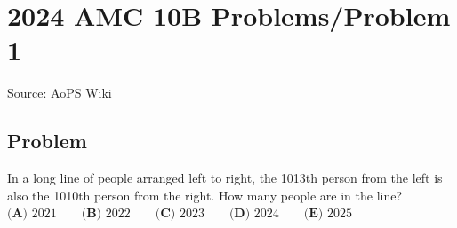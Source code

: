 \documentclass[12pt]{article}
\begin{document}
\section*{{2024 AMC 10B Problems/Problem 1}}
Source: AoPS Wiki

\subsection*{Problem}
In a long line of people arranged left to right, the 1013th person from the left is also the 1010th person from the right. How many people are in the line? $\textbf{(A) } 2021 \qquad\textbf{(B) } 2022 \qquad\textbf{(C) } 2023 \qquad\textbf{(D) } 2024 \qquad\textbf{(E) } 2025$
\end{document}
